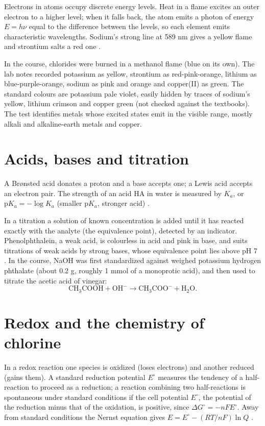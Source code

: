 Electrons in atoms occupy discrete energy
levels. Heat in a flame excites an outer
electron to a higher level; when it falls
back, the atom emits a photon of energy $E =
h\nu$ equal to the difference between the
levels, so each element emits characteristic
wavelengths. Sodium's strong line at 589 nm
gives a yellow flame and strontium salts a
red one \cite[Section
6.3]{kotz2012chemistry}.

In the course, chlorides were burned in a
methanol flame (blue on its own). The lab notes
recorded potassium as yellow, strontium as
red-pink-orange, lithium as
blue-purple-orange, sodium as pink and orange
and copper(II) as green. The standard colours
are potassium pale violet, easily hidden by
traces of sodium's yellow, lithium crimson
and copper green (not checked against the
textbooks). The test identifies metals whose
excited states emit in the visible range,
mostly alkali and alkaline-earth metals and
copper.

\section{Acids, bases and titration}
\label{section-chem-acids-bases}

A Brønsted acid donates a proton and a base
accepts one; a Lewis acid accepts an electron
pair. The strength of an acid HA in water is
measured by $K_a$, or $\mathrm{p}K_a = -\log
K_a$ (smaller $\mathrm{p}K_a$, stronger acid)
\cite[Chapter 17]{kotz2012chemistry}.

In a titration a solution of known
concentration is added until it has reacted
exactly with the analyte (the equivalence
point), detected by an indicator.
Phenolphthalein, a weak acid, is colourless
in acid and pink in base, and suits
titrations of weak acids by strong bases,
whose equivalence point lies above pH 7
\cite[Chapter 18]{kotz2012chemistry}. In the
course, NaOH was first standardized against
weighed potassium hydrogen phthalate (about
0.2 g, roughly 1 mmol of a monoprotic acid),
and then used to titrate the acetic acid of
vinegar:
$$
\mathrm{CH_3COOH} + \mathrm{OH^-} \rightarrow
\mathrm{CH_3COO^-} + \mathrm{H_2O}.
$$

\section{Redox and the chemistry of chlorine}
\label{section-chem-chlorine}

In a redox reaction one species is oxidized
(loses electrons) and another reduced (gains
them). A standard reduction potential
$E^\circ$ measures the tendency of a
half-reaction to proceed as a reduction; a
reaction combining two half-reactions is
spontaneous under standard conditions if the
cell potential $E^\circ$, the potential of
the reduction minus that of the oxidation, is
positive, since $\Delta G^\circ =
-nFE^\circ$. Away from standard conditions
the Nernst equation gives $E = E^\circ -
(RT/nF)\ln Q$ \cite[Sections
20.4--20.6]{kotz2012chemistry}.

